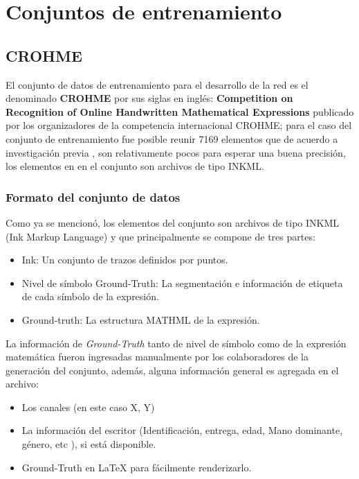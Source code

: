 \newpage
\section{Conjuntos de entrenamiento}

\subsection{CROHME}

El conjunto de datos de entrenamiento para el desarrollo de la red es el denominado \textbf{CROHME} por sus siglas en inglés: \textbf{Competition on Recognition of Online Handwritten Mathematical Expressions} publicado por los organizadores de la competencia internacional CROHME; para el caso del conjunto de entrenamiento fue posible reunir 7169 elementos que de acuerdo a investigación previa \cite{chino}, son relativamente pocos  para esperar una buena precisión, los  elementos en en el conjunto son archivos de tipo INKML.
\subsubsection{Formato del conjunto de datos}

Como ya se mencionó, los elementos del conjunto son archivos de tipo INKML (Ink Markup Language) y que principalmente se compone de tres partes:

\begin{itemize}
	\item Ink: Un conjunto de trazos definidos por puntos.
	\item Nivel de símbolo Ground-Truth: La segmentación e información de etiqueta de cada símbolo de la expresión.
	\item Ground-truth: La estructura MATHML de la expresión.
\end{itemize}

La información de \textit{Ground-Truth} tanto de nivel de símbolo como de la expresión matemática fueron ingresadas manualmente por los colaboradores de la generación del conjunto, además, alguna información general es agregada en el archivo:

\begin{itemize}
	\item Los canales (en este caso X, Y)
	\item La información del escritor (Identificación, entrega, edad, Mano dominante, género, etc ), si está disponible.
	\item Ground-Truth en \LaTeX{} para fácilmente renderizarlo.
\end{itemize}

